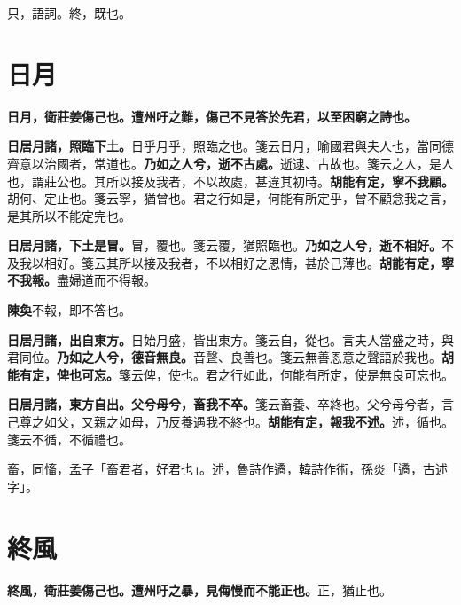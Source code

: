 \begin{quoting}只，語詞。終，既也。\end{quoting}

\section{日月}


\textbf{日月，衛莊姜傷己也。遭州吁之難，傷己不見答於先君，以至困窮之詩也。}

\textbf{日居月諸，照臨下土。}{\footnotesize 日乎月乎，照臨之也。箋云日月，喻國君與夫人也，當同德齊意以治國者，常道也。}\textbf{乃如之人兮，逝不古處。}{\footnotesize 逝逮、古故也。箋云之人，是人也，謂莊公也。其所以接及我者，不以故處，甚違其初時。}\textbf{胡能有定，寧不我顧。}{\footnotesize 胡何、定止也。箋云寧，猶曾也。君之行如是，何能有所定乎，曾不顧念我之言，是其所以不能定完也。}

\textbf{日居月諸，下土是冒。}{\footnotesize 冒，覆也。箋云覆，猶照臨也。}\textbf{乃如之人兮，逝不相好。}{\footnotesize 不及我以相好。箋云其所以接及我者，不以相好之恩情，甚於己薄也。}\textbf{胡能有定，寧不我報。}{\footnotesize 盡婦道而不得報。}

\begin{quoting}\textbf{陳奐}不報，即不答也。\end{quoting}

\textbf{日居月諸，出自東方。}{\footnotesize 日始月盛，皆出東方。箋云自，從也。言夫人當盛之時，與君同位。}\textbf{乃如之人兮，德音無良。}{\footnotesize 音聲、良善也。箋云無善恩意之聲語於我也。}\textbf{胡能有定，俾也可忘。}{\footnotesize 箋云俾，使也。君之行如此，何能有所定，使是無良可忘也。}

\textbf{日居月諸，東方自出。父兮母兮，畜我不卒。}{\footnotesize 箋云畜養、卒終也。父兮母兮者，言己尊之如父，又親之如母，乃反養遇我不終也。}\textbf{胡能有定，報我不述。}{\footnotesize 述，循也。箋云不循，不循禮也。}

\begin{quoting}畜，同慉，孟子「畜君者，好君也」。述，魯詩作遹，韓詩作術，孫炎「遹，古述字」。\end{quoting}

\section{終風}


\textbf{終風，衛莊姜傷己也。遭州吁之暴，見侮慢而不能正也。}{\footnotesize 正，猶止也。}

